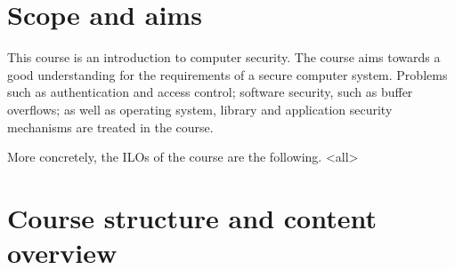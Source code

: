 \mode*

\section{Scope and aims}%
\label{sec:aim}


This course is an introduction to computer security.
The course aims towards a good understanding for the requirements of a secure 
computer system.
Problems such as authentication and access control; software security, such as 
buffer overflows; as well as operating system, library and application security 
mechanisms are treated in the course.


More concretely, the \acp{ILO} of the course are the following.
\mode<all>{}


\section{Course structure and content overview}%
\label{sec:outline}

